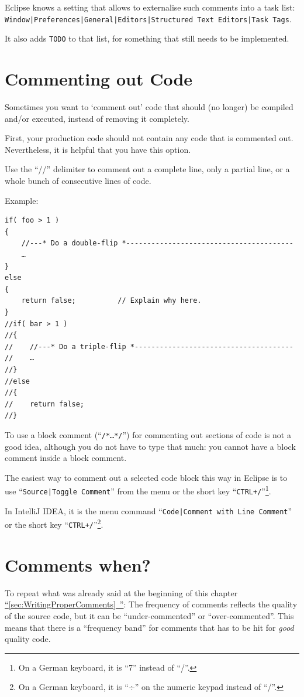 \documentclass[11pt,a4paper, titlepage, parskip=half, headsepline, footsepline, cleardoublepage=current, headheight=1cm]{scrbook}
\newcommand*{\tqfullref}[1]{\hyperref[{#1}]{“\ref*{#1}~\nameref*{#1}”}}
\begin{document}
Eclipse knows a setting that allows to externalise such comments into a task list:\\ \verb#Window|Preferences|General|Editors|Structured Text Editors|Task Tags#.

It also adds \verb#TODO# to that list, for something that still needs to be implemented.


\section{Commenting out Code}
Sometimes you want to ‘comment out’ code that should (no longer) be compiled and/or executed, instead of removing it completely.

First, your production code should not contain any code that is commented out. Nevertheless, it is helpful that you have this option.

Use the “//” delimiter to comment out a complete line, only a partial line, or a whole bunch of consecutive lines of code.

Example:
\begin{lstlisting}
if( foo > 1 )
{
    //---* Do a double-flip *----------------------------------------
    …
}
else
{
    return false;          // Explain why here.
}
//if( bar > 1 )
//{
//    //---* Do a triple-flip *--------------------------------------
//    …
//}
//else
//{
//    return false;
//}
\end{lstlisting}

To use a block comment (“\verb#/*…*/#”) for commenting out sections of code is not a good idea, although you do not have to type that much: you cannot have a block comment inside a block comment.

The easiest way to comment out a selected code block this way in Eclipse is to use “\verb#Source|Toggle Comment#” from the menu or the short key “\verb#CTRL+/#”\footnote{On a German keyboard, it is “7” instead of “/”.}.

In IntelliJ IDEA, it is the menu command “\verb#Code|Comment with Line Comment#” or the short key “\verb#CTRL+/#”\footnote{On a German keyboard, it is “÷” on the numeric keypad instead of “/”.}.

\section{Comments when?}\label{sec:CommentsWhen}
To repeat what was already said at the beginning of this chapter \tqfullref{sec:WritingProperComments}: The frequency of comments reflects the quality of the source code, but it can be “under-commented” or “over-commented”. This means that there is a “frequency band” for comments that has to be hit for \textit{good} quality code.
\end{document}
